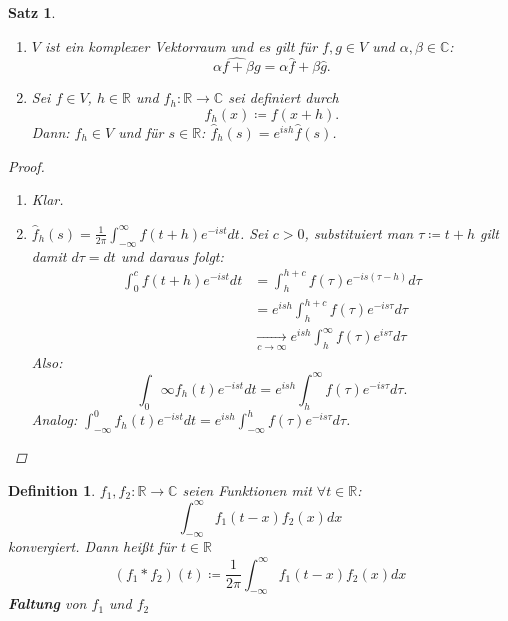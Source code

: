 \documentclass[12pt]{extreport} %
\newcommand{\C}{\mathbb{C}}
\newcommand{\R}{\mathbb{R}}
\theoremstyle{named}
\theoremstyle{nnamed}
\theoremstyle{itshape}
\newtheorem{satz}[unnamedtheorem]{Satz}
\newtheorem*{definition}{Definition}
\theoremstyle{normal}
\begin{document}
\begin{satz} ~\ \label{24.5:satz}
	\begin{enumerate}
		\item $V$ ist ein komplexer Vektorraum und es gilt für $f, g \in V$ und $\alpha, \beta \in \C$:
			$$ \widehat{\alpha f + \beta g} = \alpha \hat{f} + \beta \hat{g}. $$
		\item Sei $f \in V$, $h \in \R$ und $f_{h} \colon \R \rightarrow \C$ sei definiert durch
			$$ f_{h}(x) \coloneqq f(x + h). $$
			Dann: $f_{h} \in V$ und für $s \in \R$: $\hat{f}_{h}(s) = e^{ish} \hat{f}(s)$.
	\end{enumerate}
	
	\begin{proof}
		\begin{enumerate}
			\item Klar.
			\item $\hat{f}_{h}(s) = \frac{1}{2\pi} \int_{-\infty}^{\infty} f(t + h) e^{-ist} dt$. Sei $c > 0$, substituiert man $\tau \coloneqq t + h$ gilt damit  $d\tau = dt$ und daraus folgt:
				\begin{align*}
					\int_{0}^{c} f(t+h) e^{-ist} dt & = \int_{h}^{h+c} f(\tau) e^{-is(\tau - h)} d\tau \\
					& = e^{ish} \int_{h}^{h+c} f(\tau) e^{-is\tau} d\tau \\
					& \xrightarrow[c \rightarrow \infty]{} e^{ish} \int_{h}^{\infty} f(\tau) e^{is\tau} d\tau
				\end{align*}
				Also: 
				$$\int_{0}{\infty} f_{h}(t) e^{-ist} dt = e^{ish} \int_{h}^{\infty} f(\tau) e^{-is\tau} d\tau. $$
				Analog: $\int_{-\infty}^{0} f_{h}(t) e^{-ist} dt = e^{ish} \int_{-\infty}^{h} f(\tau) e^{-is\tau} d\tau$.
		\end{enumerate}
	\end{proof}
\end{satz}

\begin{definition}
	$f_{1}, f_{2} \colon \R \rightarrow \C$ seien Funktionen mit $\forall t \in \R$: 
	$$ \int_{-\infty}^{\infty} f_{1}(t - x) f_{2}(x) dx $$
	konvergiert. Dann hei{\ss}t für $t \in \R$
	$$ ( f_1 \ast f_2)(t) \coloneqq \frac{1}{2\pi} \int_{-\infty}^{\infty} f_1(t-x) f_2(x) dx $$
	\textbf{Faltung} von $f_1$ und $f_2$
\end{definition}
\end{document}
